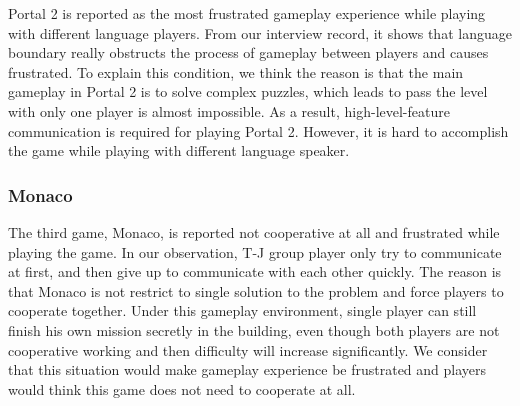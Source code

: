 Portal 2 is reported as the most frustrated gameplay experience while playing with different language players. From our interview record, it shows that language boundary really obstructs the process of gameplay between players and causes frustrated. To explain this condition, we think the reason is that the main gameplay in Portal 2 is to solve complex puzzles, which leads to pass the level with only one player is almost impossible. As a result, high-level-feature communication is required for playing Portal 2. However, it is hard to accomplish the game while playing with different language speaker.


\subsubsection{Monaco}

The third game, Monaco, is reported not cooperative at all and frustrated while playing the game. In our observation, T-J group player only try to communicate at first, and then give up to communicate with each other quickly. The reason is that Monaco is not restrict to single solution to the problem and force players to cooperate together. Under this gameplay environment, single player can still finish his own mission secretly in the building, even though both players are not cooperative working and then difficulty will increase significantly. We consider that this situation would make gameplay experience be frustrated and players would think this game does not need to cooperate at all.

